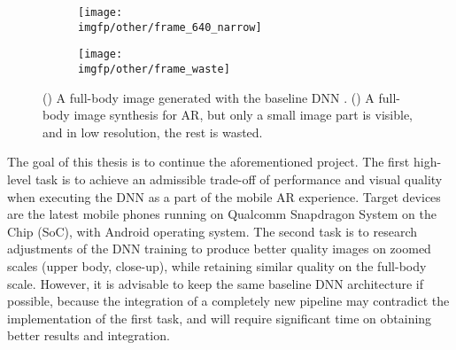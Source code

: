 \begin{figure}[h!]
	\fboxrule=2pt
	\centering
	\begin{subfigure}[b]{0.4\textwidth}
		\centering
		\texttt{[image: \\imgfp/other/frame\_640\_narrow]}
		\caption{}
		\label{intro:fig:stylepeople_frame:640}
	\end{subfigure}
	\hfill
	\begin{subfigure}[b]{0.59\textwidth}
		\centering
		\texttt{[image: \\imgfp/other/frame\_waste]}
		\caption{}
		\label{intro:fig:stylepeople_frame:waste}
	\end{subfigure}

	\caption{(\protect{}) A full-body image generated with the baseline DNN \cite{dnn:stylepeople21}. (\protect{}) A full-body image synthesis for AR, but only a small image part is visible, and in low resolution, the rest is wasted.}
	\label{intro:fig:stylepeople_frame}
\end{figure}
 
The goal of this thesis is to continue the aforementioned project. The first high-level task is to achieve an admissible trade-off of performance and visual quality when executing the DNN as a part of the mobile AR experience. Target devices are the latest mobile phones running on Qualcomm Snapdragon System on the Chip (SoC), with Android operating system. The second task is to research adjustments of the DNN training to produce better quality images on zoomed scales (upper body, close-up), while retaining similar quality on the full-body scale. However, it is advisable to keep the same baseline \cite{dnn:stylepeople21} DNN architecture if possible, because the integration of a completely new pipeline may contradict the implementation of the first task, and will require significant time on obtaining better results and integration.
 
